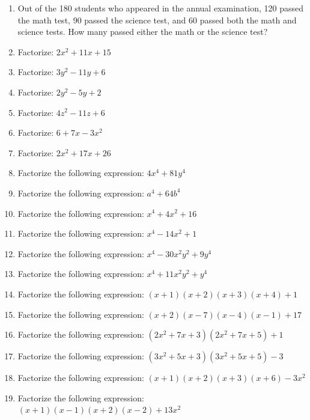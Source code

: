 \documentclass[11pt]{article}
\begin{document}
\begin{enumerate}[leftmargin=1.8cm,start=99]
\item Out of the 180 students who appeared in the annual examination, 120 passed the math test, 90 passed the science test, and 60 passed both the math and science tests. How many passed either the math or the science test?

\item Factorize: $2x^2+11x+15$

\item Factorize: $3y^2-11y+6$

\item Factorize: $2y^2-5y+2$

\item Factorize: $4z^2-11z+6$

\item Factorize: $6+7x-3x^2$

\item Factorize: $2x^2+17x+26$

\item Factorize the following expression: $4x^4+81y^4$

\item Factorize the following expression: $a^4+64b^4$

\item Factorize the following expression: $x^4+4x^2+16$

\item Factorize the following expression: $x^4-14x^2+1$

\item Factorize the following expression: $x^4-30x^2y^2+9y^4$

\item Factorize the following expression: $x^4+11x^2y^2+y^4$

\item Factorize the following expression: $(x+1)(x+2)(x+3)(x+4)+1$

\item Factorize the following expression: $(x+2)(x-7)(x-4)(x-1)+17$

\item Factorize the following expression: $(2x^2+7x+3)(2x^2+7x+5)+1$

\item Factorize the following expression: $(3x^2+5x+3)(3x^2+5x+5)-3$

\item Factorize the following expression: $(x+1)(x+2)(x+3)(x+6)-3x^2$

\item Factorize the following expression: $(x+1)(x-1)(x+2)(x-2)+13x^2$


\end{enumerate}
\end{document}
